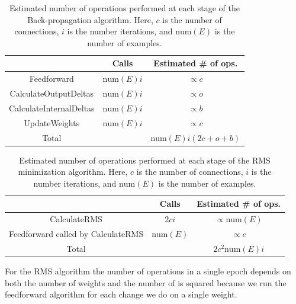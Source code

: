 \documentclass[11pt]{article}
\begin{document}
\begin{table}
	\begin{center}
		\label{tab:backpropagation}
		\begin{tabular}{ccc}
		\hline
		& Calls & Estimated \# of ops.\\
		\hline
		Feedforward & $\mbox{num}(E)i$ & $\propto c$\\
		CalculateOutputDeltas & $\mbox{num}(E)i$ & $\propto o$\\
		CalculateInternalDeltas & $\mbox{num}(E)i$ & $\propto b$\\
		UpdateWeights & $\mbox{num}(E)i$ & $\propto c$\\
		\hline
		Total & & $\mbox{num}(E)i(2c+o+b)$\\
		\hline
		\end{tabular}
		\caption{Estimated number of operations performed at each stage of the Back-propagation algorithm. Here, $c$ is the number of connections, $i$ is the number iterations, and $\mbox{num}(E)$ is the number of examples.}
	\end{center}
\end{table}

\begin{table}
	\begin{center}
		\begin{tabular}{ccc}
		\hline
		 & Calls & Estimated \# of ops.\\
		\hline
		CalculateRMS & $2ci$ & $\propto \mbox{num}(E)$\\
		Feedforward called by CalculateRMS & $\mbox{num}(E)$ & $\propto c$\\
		\hline
		Total &  & $2c^2\mbox{num}(E)i$\\
		\hline
		\end{tabular}	
	\end{center}
	\caption{Estimated number of operations performed at each stage of the RMS minimization algorithm. Here, $c$ is the number of connections, $i$ is the number iterations, and $\mbox{num}(E)$ is the number of examples.}
	\label{tab:RMSminimization}
\end{table}

For the RMS algorithm the number of operations in a single epoch depends on both the number of weights and the number of is squared
because we run the feedforward algorithm for each change we do on a single weight.
\end{document}
